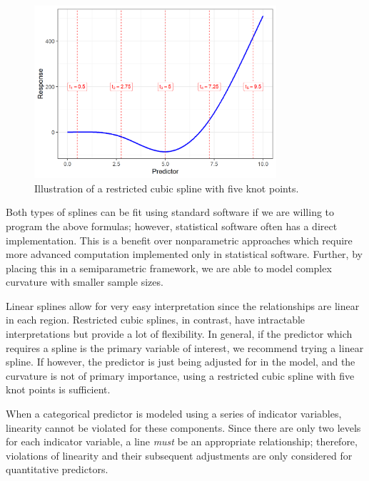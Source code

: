 \documentclass[
]{book}
\theoremstyle{plain}
\theoremstyle{mydefn}
\theoremstyle{myexmpl}
\theoremstyle{remark}
\begin{document}
\begin{figure}

{\centering \includegraphics[width=0.8\textwidth]{./Images/glm-splines-restricted-cubic-spline-1} 

}

\caption{Illustration of a restricted cubic spline with five knot points.}\label{fig:glm-splines-restricted-cubic-spline}
\end{figure}

Both types of splines can be fit using standard software if we are willing to program the above formulas; however, statistical software often has a direct implementation. This is a benefit over nonparametric approaches which require more advanced computation implemented only in statistical software. Further, by placing this in a semiparametric framework, we are able to model complex curvature with smaller sample sizes.

Linear splines allow for very easy interpretation since the relationships are linear in each region. Restricted cubic splines, in contrast, have intractable interpretations but provide a lot of flexibility. In general, if the predictor which requires a spline is the primary variable of interest, we recommend trying a linear spline. If however, the predictor is just being adjusted for in the model, and the curvature is not of primary importance, using a restricted cubic spline with five knot points is sufficient.

\begin{rmdtip}
When a categorical predictor is modeled using a series of indicator variables, linearity cannot be violated for these components. Since there are only two levels for each indicator variable, a line \emph{must} be an appropriate relationship; therefore, violations of linearity and their subsequent adjustments are only considered for quantitative predictors.
\end{rmdtip}
\end{document}

